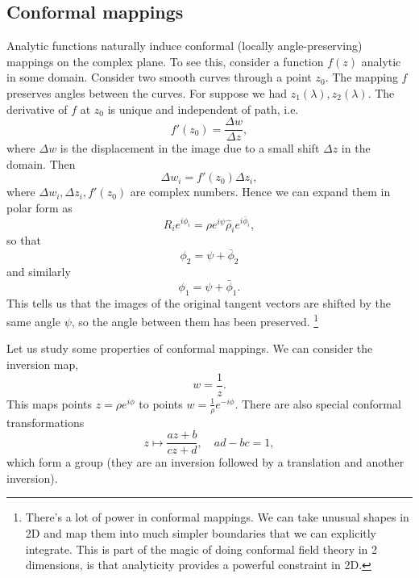\subsection*{Conformal mappings}

Analytic functions naturally induce conformal (locally angle-preserving) mappings on the complex plane. To see this, consider a function $f(z)$ analytic in some domain. Consider two smooth curves through a point $z_0$. The mapping $f$ preserves angles between the curves. For suppose we had $z_1(\lambda),z_2(\lambda)$. The derivative of $f$ at $z_0$ is unique and independent of path, i.e.
\begin{equation}
    f'(z_0) = \frac{\Delta w}{\Delta z},
\end{equation}
where $\Delta w$ is the displacement in the image due to a small shift $\Delta z$ in the domain. Then
\begin{equation}
    \Delta w_i = f'(z_0) \Delta z_i,
\end{equation}
where $\Delta w_i,\Delta z_i, f'(z_0)$ are complex numbers. Hence we can expand them in polar form as
\begin{equation}
    R_i e^{i\phi_i} = \rho e^{i\psi} \hat \rho_i e^{i\bar\phi_i},
\end{equation}
so that
\begin{equation}
    \phi_2 = \psi + \bar \phi_2
\end{equation}
and similarly
\begin{equation}
    \phi_1 = \psi + \bar \phi_1.
\end{equation}
This tells us that the images of the original tangent vectors are shifted by the same angle $\psi$, so the angle between them has been preserved.%
    \footnote{There's a lot of power in conformal mappings. We can take unusual shapes in 2D and map them into much simpler boundaries that we can explicitly integrate. This is part of the magic of doing conformal field theory in 2 dimensions, is that analyticity provides a powerful constraint in 2D.}

Let us study some properties of conformal mappings. We can consider the inversion map,
\begin{equation}
    w=\frac{1}{z}.
\end{equation}
This maps points $z=\rho e^{i\phi}$ to points $w=\frac{1}{\rho} e^{-i\phi}$. There are also special conformal transformations
\begin{equation}
    z\mapsto \frac{az+b}{cz+d},\quad ad-bc=1,
\end{equation}
which form a group (they are an inversion followed by a translation and another inversion).

